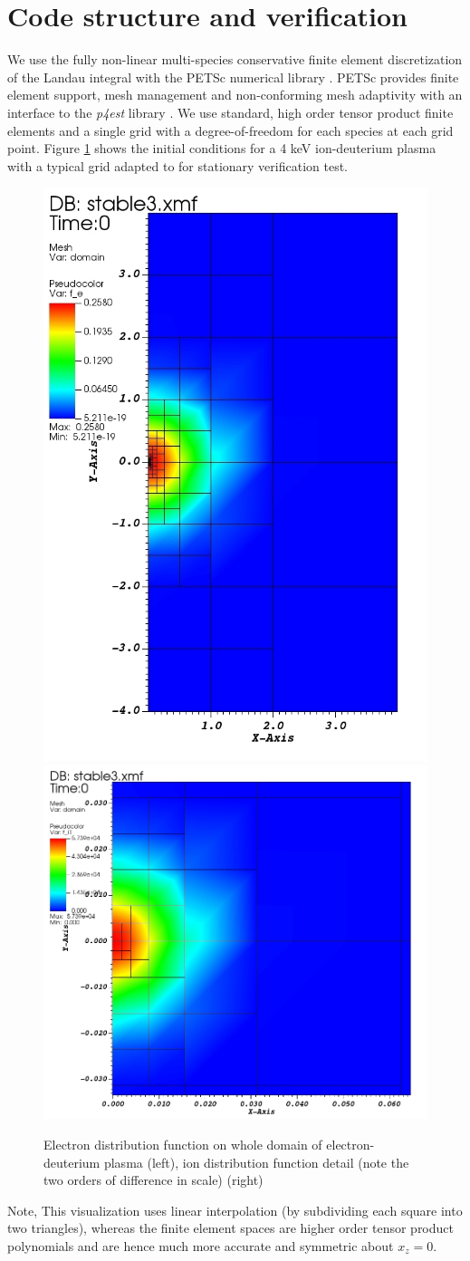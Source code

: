 \documentclass[12pt]{siamart}
\begin{document}
\section{Code structure and verification}
We use the fully non-linear multi-species conservative finite element discretization of the Landau integral \cite{Hirvijoki2016,AdamsHirvijokiKnepleyBrownIsaacMills2017} with the PETSc numerical library \cite{petsc-web-page,petsc-user-ref}. 
PETSc provides finite element support, mesh management and non-conforming mesh adaptivity with an interface to the {\it p4est} library
\cite{Stadler1033,DBLP:journals/siamsc/IsaacBWG15,Rudi:2015:EIS:2807591.2807675}.
We use standard, high order tensor product finite elements and a single grid with a degree-of-freedom for each species at each grid point.
Figure \ref{fig:grids} shows the initial conditions for a 4 keV ion-deuterium plasma with a typical grid adapted to for stationary verification test.
\begin{figure}[htbp]
\begin{center}
\includegraphics[width=.34\linewidth]{AMR0003.jpeg}
\includegraphics[width=.55\linewidth]{AMR0002.jpeg}
\caption{Electron distribution function on whole domain of electron-deuterium plasma (left), ion distribution function detail (note the two orders of difference in scale) (right)}
\label{fig:grids}
\end{center}
\end{figure}
Note, This visualization uses linear interpolation (by subdividing each square into two triangles), whereas the finite element spaces are higher order tensor product polynomials and are hence much more accurate and symmetric about $x_z=0$.
\end{document}
